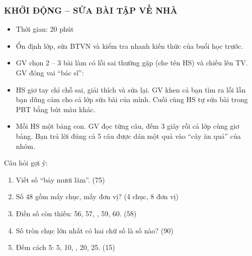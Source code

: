 \documentclass[../main.tex]{subfiles}
\begin{document}
\subsubsection{KHỞI ĐỘNG -- SỬA BÀI TẬP VỀ NHÀ}
\begin{hd}
    \begin{itemize}
        \item Thời gian: 20 phút
        \item Ổn định lớp, sửa BTVN và kiểm tra nhanh kiến thức của buổi học trước.
    \end{itemize}
\end{hd}
\begin{itemize}
    \item GV chọn 2 -- 3 bài làm có lỗi sai thường gặp (che tên HS) và chiếu lên TV. GV đóng vai “bác sĩ”: 
    \item HS giơ tay chỉ chỗ sai, giải thích và sửa lại. GV khen cả bạn tìm ra lỗi lẫn bạn dũng cảm cho cả lớp sửa bài của mình. Cuối cùng HS tự sửa bài trong PBT bằng bút màu khác.
\end{itemize}
\begin{itemize}
    \item Mỗi HS một bảng con. GV đọc từng câu, đếm 3 giây rồi cả lớp cùng giơ bảng. Bạn trả lời đúng cả 5 câu được dán một quả vào “cây ăn quả” của nhóm.
\end{itemize}
\begin{vd}
    Câu hỏi gợi ý:
    \begin{enumerate}
        \item Viết số “bảy mươi lăm”. \hfill (75)
        \item Số 48 gồm mấy chục, mấy đơn vị? \hfill (4 chục, 8 đơn vị)
        \item Điền số còn thiếu: 56, 57, \TTcham[1cm], 59, 60. \hfill (58)
        \item Số tròn chục lớn nhất có hai chữ số là số nào? \hfill (90)
        \item Đếm cách 5: 5, 10, \TTcham[1cm], 20, 25. \hfill (15)
    \end{enumerate}
\end{vd}

\end{document}
